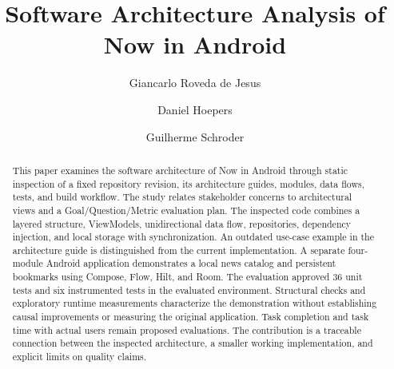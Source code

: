 
\usepackage{tabularx}




\title{Software Architecture Analysis of Now in Android}

\author{Giancarlo Roveda de Jesus}

\author{Daniel Hoepers}

\author{Guilherme Schroder}

\begin{abstract}
This paper examines the software architecture of Now in Android through
static inspection of a fixed repository revision, its architecture guides,
modules, data flows, tests, and build workflow. The study relates stakeholder
concerns to architectural views and a Goal/Question/Metric evaluation plan.
The inspected code combines a layered structure, ViewModels, unidirectional
data flow, repositories, dependency injection, and local storage with
synchronization. An outdated use-case example in the architecture guide is
distinguished from the current implementation. A separate four-module Android
application demonstrates a local news catalog and persistent bookmarks using
Compose, Flow, Hilt, and Room. The evaluation approved 36 unit tests and six instrumented tests
in the evaluated environment. Structural checks and exploratory runtime
measurements characterize the demonstration without establishing causal
improvements or measuring the original application. Task completion and task
time with actual users remain proposed evaluations. The contribution is a
traceable connection between the inspected architecture, a smaller working
implementation, and explicit limits on quality claims.
\end{abstract}



